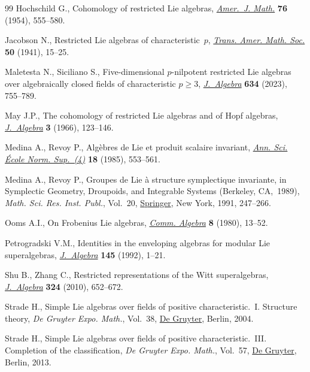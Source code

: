 \begin{thebibliography}{99}
Hochschild G., Cohomology of restricted {L}ie algebras, \href{https://doi.org/10.2307/2372701}{\textit{Amer.~J. Math.}}
 \textbf{76} (1954), 555--580.

Jacobson N., Restricted {L}ie algebras of characteristic~{$p$}, \href{https://doi.org/10.2307/1989908}{\textit{Trans.
 Amer. Math. Soc.}} \textbf{50} (1941), 15--25.

Maletesta N., Siciliano S., Five-dimensional {$p$}-nilpotent restricted {L}ie
 algebras over algebraically closed fields of characteristic {$p\geq3$},
 \href{https://doi.org/10.1016/j.jalgebra.2023.05.029}{\textit{J.~Algebra}} \textbf{634} (2023), 755--789.

May J.P., The cohomology of restricted {L}ie algebras and of {H}opf algebras,
 \href{https://doi.org/10.1016/0021-8693(66)90009-3}{\textit{J.~Algebra}} \textbf{3} (1966), 123--146.

Medina A., Revoy P., Alg\`ebres de {L}ie et produit scalaire invariant,
 \href{https://doi.org/10.24033/asens.1496}{\textit{Ann. Sci. \'Ecole Norm. Sup.~(4)}} \textbf{18} (1985), 553--561.

Medina A., Revoy P., Groupes de {L}ie \`a structure symplectique invariante, in
 Symplectic {G}eometry, {D}roupoids, and {I}ntegrable {S}ystems ({B}erkeley,
 {CA},~1989), \textit{Math. Sci. Res. Inst. Publ.}, Vol.~20, \href{https://doi.org/10.1007/978-1-4613-9719-9_17}{Springer}, New
 York, 1991, 247--266.

Ooms A.I., On {F}robenius {L}ie algebras, \href{https://doi.org/10.1080/00927878008822445}{\textit{Comm. Algebra}} \textbf{8}
 (1980), 13--52.

Petrogradski V.M., Identities in the enveloping algebras for modular {L}ie
 superalgebras, \href{https://doi.org/10.1016/0021-8693(92)90173-J}{\textit{J.~Algebra}} \textbf{145} (1992), 1--21.

Shu B., Zhang C., Restricted representations of the {W}itt superalgebras,
 \href{https://doi.org/10.1016/j.jalgebra.2010.04.032}{\textit{J.~Algebra}} \textbf{324} (2010), 652--672.

Strade H., Simple {L}ie algebras over fields of positive characteristic.~{I}.
 {S}tructure theory, \textit{De Gruyter Expo. Math.}, Vol.~38, \href{https://doi.org/10.1515/9783110197945}{De Gruyter},
 Berlin, 2004.

Strade H., Simple {L}ie algebras over fields of positive characteristic.~{III}.
 {C}ompletion of the classification, \textit{De Gruyter Expo. Math.}, Vol.~57,
 \href{https://doi.org/10.1515/9783110263015}{De Gruyter}, Berlin, 2013.


\end{thebibliography}
